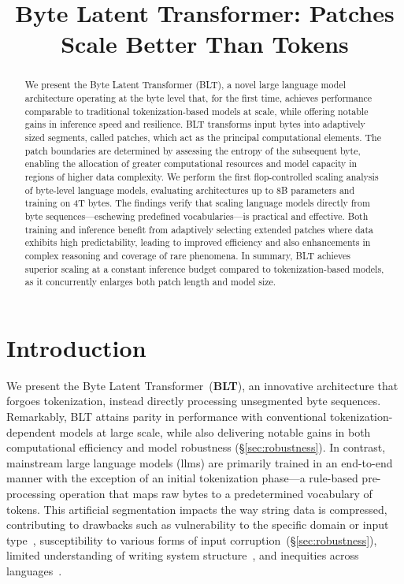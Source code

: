\title{Byte Latent Transformer: Patches Scale Better Than Tokens}

\begin{abstract}
We present the Byte Latent Transformer ({\textsc BLT}), a novel large language model architecture operating at the byte level that, for the first time, achieves performance comparable to traditional tokenization-based models at scale, while offering notable gains in inference speed and resilience. {\textsc BLT} transforms input bytes into adaptively sized segments, called patches, which act as the principal computational elements. The patch boundaries are determined by assessing the entropy of the subsequent byte, enabling the allocation of greater computational resources and model capacity in regions of higher data complexity. We perform the first flop-controlled scaling analysis of byte-level language models, evaluating architectures up to 8B parameters and training on 4T bytes. The findings verify that scaling language models directly from byte sequences—eschewing predefined vocabularies—is practical and effective. Both training and inference benefit from adaptively selecting extended patches where data exhibits high predictability, leading to improved efficiency and also enhancements in complex reasoning and coverage of rare phenomena. In summary, {\textsc BLT} achieves superior scaling at a constant inference budget compared to tokenization-based models, as it concurrently enlarges both patch length and model size.
\end{abstract}

\section{Introduction}
\label{section:intro}

We present the Byte Latent Transformer~(\textbf{BLT}), an innovative architecture that forgoes tokenization, instead directly processing unsegmented byte sequences. Remarkably, BLT attains parity in performance with conventional tokenization-dependent models at large scale, while also delivering notable gains in both computational efficiency and model robustness (\S\ref{sec:robustness}). In contrast, mainstream large language models (llms) are primarily trained in an end-to-end manner with the exception of an initial tokenization phase—a rule-based pre-processing operation that maps raw bytes to a predetermined vocabulary of tokens. This artificial segmentation impacts the way string data is compressed, contributing to drawbacks such as vulnerability to the specific domain or input type~\citep{dagangetting}, susceptibility to various forms of input corruption~(\S\ref{sec:robustness}), limited understanding of writing system structure~\citep{edman2024cute}, and inequities across languages~\citep{liang2023xlm,petrov2024language,limisiewicz2024myte}.

